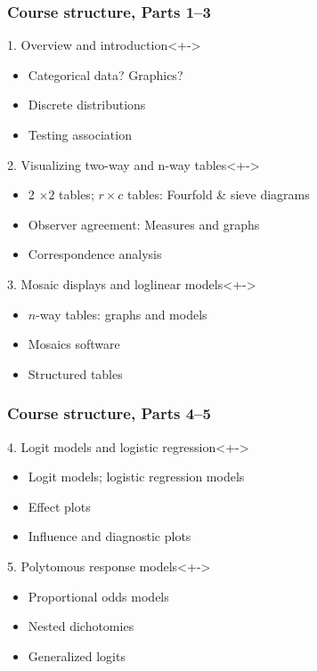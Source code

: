 \renewcommand{\FileName}{structure}

\begin{frame}
  \frametitle{Course structure, Parts 1--3}
  \begin{block}{1. Overview and introduction}<+->
     \begin{itemize}
      \item Categorical data? Graphics?
      \item Discrete distributions
      \item Testing association
     \end{itemize}
  \end{block}

  \begin{block}{2. Visualizing two-way and n-way tables}<+->
     \begin{itemize}
      \item 2 $\times 2$ tables; $r \times c$ tables: Fourfold \& sieve diagrams
      \item Observer agreement: Measures and graphs
      \item Correspondence analysis 
     \end{itemize}
  \end{block}

  \begin{block}{3. Mosaic displays and loglinear models}<+->
     \begin{itemize}
      \item $n$-way tables: graphs and models
      \item Mosaics software
      \item Structured tables 
     \end{itemize}   
  \end{block}
\end{frame}

\begin{frame}
  \frametitle{Course structure, Parts 4--5}
  \begin{block}{4. Logit models and logistic regression}<+->
     \begin{itemize}
      \item Logit models; logistic regression models
	  \item Effect plots
      \item Influence and diagnostic plots
     \end{itemize}   
  \end{block}
  \begin{block}{5. Polytomous response models}<+->
     \begin{itemize}
      \item Proportional odds models
	  \item Nested dichotomies
      \item Generalized logits
     \end{itemize}   
  \end{block}
\end{frame}

